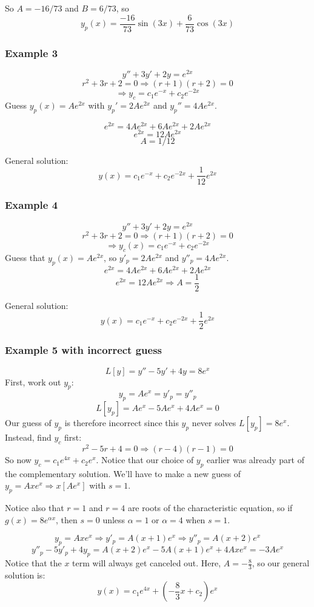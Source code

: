 \documentclass[11pt]{article}
\begin{document}
	So $A = -16/73$ and $B = 6/73$, so
		$$ y_p(x) = \frac{-16}{73} \sin(3x) + \frac{6}{73} \cos(3x) $$

\subsubsection{Example 3}
		$$ y'' + 3y' + 2y = e^{2x} $$
		$$ r^2 + 3r + 2 = 0 \Rightarrow (r+1)(r+2) = 0 $$
		$$ \Rightarrow y_c = c_1 e^{-x} + c_2 e^{-2x} $$
	Guess $y_p(x) = Ae^{2x}$ with $y_p' = 2Ae^{2x}$ and $y_p'' = 4Ae^{2x}$.

		$$ e^{2x} = 4 A e^{2x} + 6Ae^{2x} + 2A e^{2x} $$
		$$ e^{2x} = 12A e^{2x} $$
		$$ A = 1/12 $$

	General solution:
		$$ y(x) = c_1 e^{-x} + c_2 e^{-2x} + \frac{1}{12} e^{2x} $$

\subsubsection{Example 4}
		$$ y'' + 3y' + 2y = e^{2x} $$
		$$ r^2 + 3r + 2 = 0 \Rightarrow (r+1)(r+2) = 0 $$
		$$ \Rightarrow y_c(x) = c_1 e^{-x} + c_2 e^{-2x} $$
	Guess that $y_p (x) = A e^{2x}$, so $y'_p = 2Ae^{2x}$ and $y''_p = 4Ae^{2x}$.
		$$ e^{2x} = 4Ae^{2x} + 6Ae^{2x} + 2Ae^{2x} $$
		$$ e^{2x} = 12Ae^{2x} \Rightarrow A = \frac{1}{2} $$

	General solution:
		$$ y(x) = c_1 e^{-x} + c_2 e^{-2x} + \frac{1}{2} e^{2x} $$

\subsubsection{Example 5 with incorrect guess}
		$$ L[y] = y'' - 5y' + 4y = 8e^x $$
	First, work out $y_p$:
		$$ y_p = Ae^x = y'_p = y''_p $$
		$$ L[y_p] = Ae^x -5Ae^x + 4Ae^x = 0$$
	Our guess of $y_p$ is therefore incorrect since this $y_p$ never solves $L[y_p] = 8e^x$. Instead, find $y_c$ first:
		$$ r^2 - 5r + 4 = 0 \Rightarrow (r-4)(r-1) = 0 $$
	So now $y_c = c_1 e^{4x} + c_2 e^x$. Notice that our choice of $y_p$ earlier was already part of the complementary solution. We'll have to make a new guess of $y_p = Axe^x \Rightarrow x[Ae^x]$ with $s=1$.

	Notice also that $r=1$ and $r=4$ are roots of the characteristic equation, so if $g(x) = 8e^{\alpha x}$, then $s=0$ unless $\alpha = 1$ or $\alpha = 4$ when $s=1$.

		$$ y_p = Axe^x \Rightarrow y'_p = A(x+1)e^x \Rightarrow y''_p = A(x+2)e^x $$
		$$ y''_p - 5y'_p + 4y_p = A(x+2)e^x -5A(x+1)e^x + 4Axe^x = -3Ae^x $$
	Notice that the $x$ term will always get canceled out. Here, $A = - \frac{8}{3}$, so our general solution is:
		$$ y (x) = c_1 e^{4x} + \left(-\frac{8}{3} x + c_2\right)e^x $$
\end{document}
